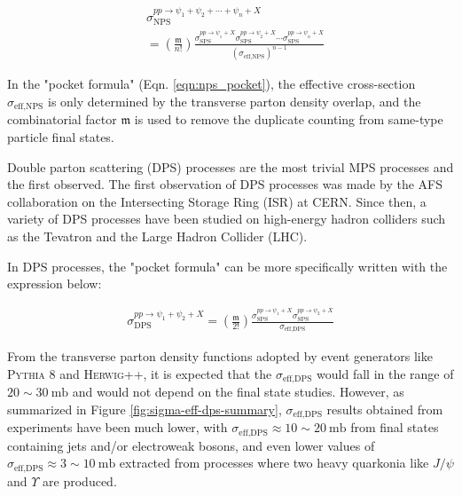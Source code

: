 \documentclass[10pt,twocolumn]{article}
\newcommand*{\effXsecDPS}{\sigma_{\text{eff,DPS}}}
\begin{document}
\begin{equation}
\begin{aligned}
    \label{eqn:nps_pocket}
    &\sigma^{pp\to\psi_1+\psi_2+\cdots+\psi_n+X}_{\text{NPS}} \\&=
    \left(\frac {\mathfrak{m}}{n!}\right) \frac{\sigma_{\text{SPS}}^{pp\to \psi_1+X}\sigma_{\text{SPS}}^{pp\to \psi_2+X}\cdots\sigma_{\text{SPS}}^{pp\to \psi_n+X}}{(\sigma_{\text{eff,NPS}})^{n-1}}
\end{aligned}
\end{equation}

In the "pocket formula" (Eqn. \ref{eqn:nps_pocket}), the effective cross-section $\sigma_{\text{eff,NPS}}$ is only determined by the transverse parton density overlap, and the combinatorial factor $\mathfrak{m}$ is used to remove the duplicate counting from same-type particle final states.

Double parton scattering (DPS) processes are the most trivial MPS processes and the first observed. The first observation of DPS processes was made by the AFS collaboration on the Intersecting Storage Ring (ISR) at CERN\cite{AxialFieldSpectrometer:1986dfj}. Since then, a variety of DPS processes have been studied on high-energy hadron colliders such as the Tevatron and the Large Hadron Collider (LHC).

In DPS processes, the "pocket formula" can be more specifically written with the expression below:

\begin{equation}
\begin{aligned}
    \label{eqn:dps_pocket}
    \sigma^{pp\to\psi_1+\psi_2+X}_{\text{DPS}}=
    \left(\frac {\mathfrak{m}}{2!}\right) \frac{\sigma_{\text{SPS}}^{pp\to \psi_1+X}\sigma_{\text{SPS}}^{pp\to \psi_2+X}}{\effXsecDPS}
\end{aligned}
\end{equation}

From the transverse parton density functions adopted by event generators like \textsc{Pythia 8} and \textsc{Herwig++}, it is expected that the $\sigma_\text{eff,DPS}$ would fall in the range of $20 \sim 30~\mathrm{mb}$ and would not depend on the final state studies. However, as summarized in Figure \ref{fig:sigma-eff-dps-summary}, $\sigma_\text{eff,DPS}$ results obtained from experiments have been much lower, with $\sigma_\text{eff,DPS}\approx 10\sim 20~\text{mb}$ from final states containing jets and/or electroweak bosons\cite{ATLAS_4JET_7TEV}\cite{ATLAS_WJetJet_7TEV}\cite{ATLAS_Z_JPSI}\cite{CDF_4JET}\cite{CMS_4JET_13TEV}\cite{CMS_WJETJET_7TEV}\cite{CMS_WW_DPS_8TEV_LIM}\cite{CMS_WW_DPS_13TEV_FOUND}, and even lower values of $\sigma_\text{eff,DPS}\approx 3\sim 10~\text{mb}$ extracted from processes where two heavy quarkonia like $J/\psi$ and $\Upsilon$ are produced\cite{ATLAS_JPSIJPSI_8TEV}\cite{ATLAS_JPSI_PSI2S_7_8_TEV_COMBINED}\cite{CMS_INCL_JPSIJPSI_7TEV}\cite{ CMS_JPSIPSI2S_7TEV}\cite{CMS_JPSIPSI2S_DIFF_7TEV}\cite{CMS_YY_8TEV}\cite{CMS_YY_XSEC}.
\end{document}
